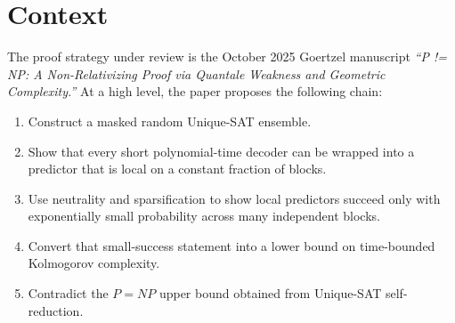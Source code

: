 \documentclass[11pt]{article}
\theoremstyle{remark}
\begin{document}
\begin{abstract}
Fourth, the natural ``short global program'' rescue also fails on its own: if the switched input
really has only \(n = O(\log m)\) visible bits, then an arbitrary local rule on those bits can be
hard-wired by a truth table of size \(2^n = \mathrm{poly}(m)\).  So polynomial-size decoders do
not by themselves force any small subclass inside the full local-rule space.

Fifth, the most creative metagraph-style rescue faces its own exactness barrier: if a quotient
state must capture the full interface behavior of a \(k\)-bit local gadget, then there are
\(2^{k2^k}\) such boundary transducers.  At binary-log width this already forces at least linear
code size in \(m\), so a small exact metagraph/message quotient cannot appear by default.

Sixth, even the tree-message route does not follow from tree-likeness alone: a fixed perfect
binary tree architecture of depth \(n\) already realizes every Boolean rule on \(n\) visible bits,
just by changing its leaf labels.

At the same time, the optimistic Lean work now isolates the precise positive interface one
would need for the switching lemma to go through: a \emph{small explicitly encoded
hypothesis family} whose realized classifier class is bounded by its code budget, together
with a perspective-relative notion of accessible input surface inspired by the existing
Hyperseed formalization.

These results do not by themselves disprove the whole paper.  They do isolate an essential gap:
the switching/locality step must be strengthened by a real theorem showing that the specific
switched predictors lie in an exceptionally small subclass, not merely in the class of all local
functions.
\end{abstract}

\tableofcontents

\section{Context}

The proof strategy under review is the October 2025 Goertzel manuscript
\emph{``P != NP: A Non-Relativizing Proof via Quantale Weakness and Geometric Complexity.''}
At a high level, the paper proposes the following chain:
\begin{enumerate}[leftmargin=1.5em]
  \item Construct a masked random Unique-SAT ensemble.
  \item Show that every short polynomial-time decoder can be wrapped into a predictor that is
  local on a constant fraction of blocks.
  \item Use neutrality and sparsification to show local predictors succeed only with exponentially
  small probability across many independent blocks.
  \item Convert that small-success statement into a lower bound on time-bounded Kolmogorov
  complexity.
  \item Contradict the $P=NP$ upper bound obtained from Unique-SAT self-reduction.
\end{enumerate}
\end{document}
